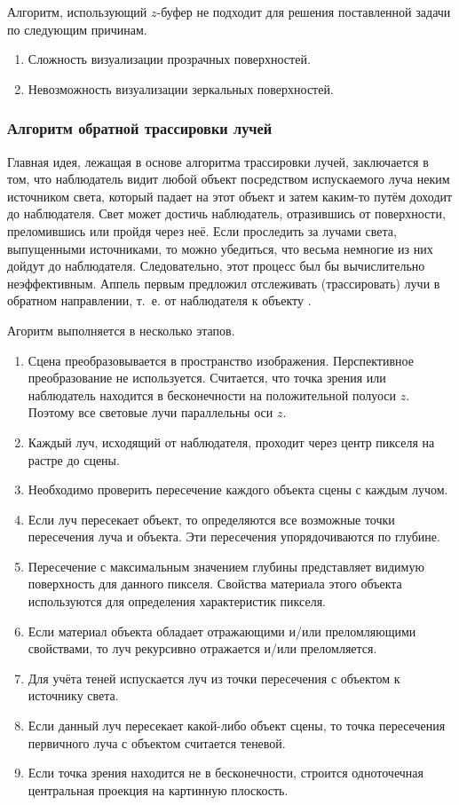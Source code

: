 Алгоритм, использующий $z$-буфер не подходит для решения поставленной задачи по следующим причинам.

\begin{enumerate}[label=\arabic*)]
	\item Сложность визуализации прозрачных поверхностей.
	\item Невозможность визуализации зеркальных поверхностей.
\end{enumerate}

\subsubsection{Алгоритм обратной трассировки лучей}

Главная идея, лежащая в основе алгоритма трассировки лучей, заключается в том, что наблюдатель видит любой объект посредством испускаемого луча неким источником света, который падает на этот объект и затем каким-то путём доходит до наблюдателя. Свет может достичь наблюдатель, отразившись от поверхности, преломившись или пройдя через неё. Если проследить за лучами света, выпущенными источниками, то можно убедиться, что весьма немногие из них дойдут до наблюдателя. Следовательно, этот процесс был бы вычислительно неэффективным. Аппель первым предложил отслеживать (трассировать) лучи в обратном направлении, т.~е. от наблюдателя к объекту \cite{rodgers}.

Агоритм выполняется в несколько этапов.

\begin{enumerate}[label=\arabic*)]
	\item Сцена преобразовывается в пространство изображения. Перспективное преобразование не используется. Считается, что точка зрения или наблюдатель находится в бесконечности на положительной полуоси $z$. Поэтому все световые лучи параллельны оси $z$. 
	\item Каждый луч, исходящий от наблюдателя, проходит через центр пикселя на растре до сцены.
	\item Необходимо проверить пересечение каждого объекта сцены с каждым лучом.
	\item Если луч пересекает объект, то определяются все возможные точки пересечения луча и объекта. Эти пересечения упорядочиваются по глубине.
	\item Пересечение с максимальным значением глубины представляет видимую поверхность для данного пикселя. Свойства материала этого объекта используются для определения характеристик пикселя.
	\item Если материал объекта обладает отражающими и/или преломляющими свойствами, то луч рекурсивно отражается и/или преломляется.
	\item Для учёта теней испускается луч из точки пересечения с объектом к источнику света.
	\item Если данный луч пересекает какой-либо объект сцены, то точка пересечения первичного луча с объектом считается теневой.
	\item Если точка зрения находится не в бесконечности, строится одноточечная центральная проекция на картинную плоскость.
\end{enumerate}


